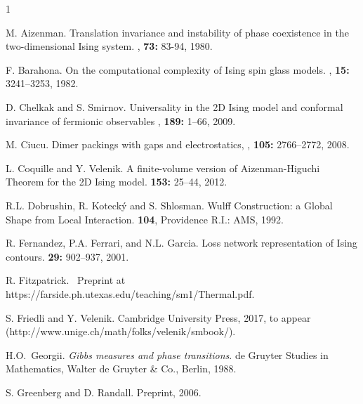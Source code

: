\documentclass[letterpaper,english,numberwithinsect]{amsart}
\begin{document}
\begin{thebibliography}{1}

M. Aizenman.
\newblock Translation invariance and instability of phase coexistence in the two-dimensional Ising system.
, {\bf 73:} 83-94, 1980.

\label{baharona}
F. Barahona.
\newblock On the computational complexity of Ising spin glass models. 
, {\bf 15:} 3241–3253, 1982.

\label{cs}
D.  Chelkak and S. Smirnov.
\newblock Universality in the 2D Ising model and conformal invariance of fermionic observables
, {\bf 189:} 1--66, 2009.

\label{ciucu}
M. Ciucu.
\newblock Dimer packings with gaps and electrostatics, 
, {\bf 105:} 2766--2772, 2008.


\label{cv}
L. Coquille and Y. Velenik.
\newblock A finite-volume version of Aizenman-Higuchi Theorem for the 2D Ising model.
 {\bf 153:} 25--44, 2012.

\label{dks}
R.L. Dobrushin, R. Koteck\'y and S. Shlosman.
\newblock Wulff Construction: a Global Shape from Local Interaction. 
 {\bf 104}, Providence R.I.: AMS, 1992.

\label{fer}
R. Fernandez, P.A. Ferrari, and N.L. Garcia.
\newblock Loss network representation of Ising contours.
 {\bf 29:} 902--937, 2001.

\label{fit}
R. Fitzpatrick.
  \ Preprint at \hfill \\
\newblock https://farside.ph.utexas.edu/teaching/sm1/Thermal.pdf.

\label{fri}
S. Friedli and Y. Velenik.
\newblock Cambridge University Press, 2017, to appear
(http://www.unige.ch/math/folks/velenik/smbook/).

\label{georg}
H.O.~Georgii.
\newblock \emph{Gibbs measures and phase transitions}.
\newblock de Gruyter Studies in Mathematics, Walter de Gruyter \& Co., 
Berlin, 1988.

\label{gr}
S. Greenberg and D. Randall.
\newblock Preprint, 2006.


\end{thebibliography}
\end{document}
